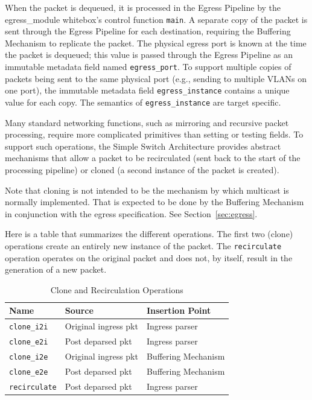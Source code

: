 \documentclass[12pt]{article}
\begin{document}
When the packet is dequeued, it is processed in the Egress Pipeline by the
egress_module whitebox's control function \texttt{main}. A separate copy of the
packet is sent through the Egress Pipeline for each destination, requiring the
Buffering Mechanism to replicate the packet. The physical egress port is known
at the time the packet is dequeued; this value is passed through the Egress
Pipeline as an immutable metadata field named \texttt{egress_port}. To support
multiple copies of packets being sent to the same physical port (e.g., sending
to multiple VLANs on one port), the immutable metadata field
\texttt{egress_instance} contains a unique value for each copy. The semantics of
\texttt{egress_instance} are target specific.


Many standard networking functions, such as mirroring and recursive packet
processing, require more complicated primitives than setting or testing fields.
To support such operations, the Simple Switch Architecture provides abstract
mechanisms that allow a packet to be recirculated (sent back to the start of
the processing pipeline) or cloned (a second instance of the packet is created).

Note that cloning is not intended to be the mechanism by which multicast is 
normally implemented. That is expected to be done by the Buffering Mechanism 
in conjunction with the egress specification. See Section~\ref{sec:egress}.
 
Here is a table that summarizes the different operations.  The first two
(clone) operations create an entirely new instance of the packet.  The
\texttt{recirculate} operation operates on the original packet and does not, 
by itself, result in the generation of a new packet.

\begin{table}[H]
\begin{center}
\begin{tabular}{| l | l | l |} \hline
\textbf{Name} &
\textbf{Source} &
\textbf{Insertion Point} \\ \hline
\texttt{clone_i2i} &
Original ingress pkt &
Ingress parser \\ \hline
\texttt{clone_e2i} &
Post deparsed pkt &
Ingress parser \\ \hline
\texttt{clone_i2e} &
Original ingress pkt &
Buffering Mechanism \\ \hline
\texttt{clone_e2e} &
Post deparsed pkt &
Buffering Mechanism \\ \hline
\texttt{recirculate} &
Post deparsed pkt &
Ingress parser \\ \hline
\end{tabular}
\end{center}
\caption{Clone and Recirculation Operations}
\label{tab:clonerecircprimitives}
\end{table}
\end{document}
